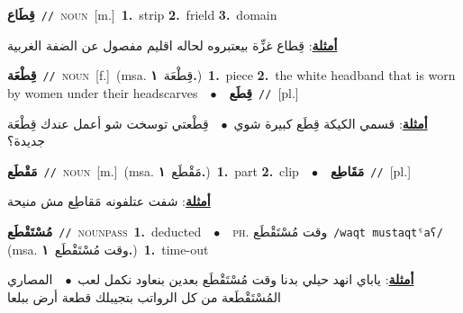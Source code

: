 \documentclass[10pt,a4paper,twoside]{article} %
\begin{document}
\begin{multicols}{2}
{\setlength\topsep{0pt}\textbf{\foreignlanguage{arabic}{قِطَاع}}\ {\color{gray}\texttt{//}\color{black}}\ \textsc{noun}\ [m.]\ \textbf{1.}~strip  \textbf{2.}~frield  \textbf{3.}~domain\  \begin{flushright}\color{gray}\foreignlanguage{arabic}{\textbf{\underline{\foreignlanguage{arabic}{أمثلة}}}: قِطاع غزِّة بيعتبروه لحاله اقليم مفصول عن الضفة الغربية}\end{flushright}\color{black}} \vspace{2mm}

{\setlength\topsep{0pt}\textbf{\foreignlanguage{arabic}{قِطْعَة}}\ {\color{gray}\texttt{//}\color{black}}\ \textsc{noun}\ [f.]\ \color{gray}(msa. \foreignlanguage{arabic}{قِطْعَة}~\foreignlanguage{arabic}{\textbf{١.}})\color{black}\ \textbf{1.}~piece  \textbf{2.}~the white headband that is worn by women under their headscarves\ \ $\bullet$\ \ \setlength\topsep{0pt}\textbf{\foreignlanguage{arabic}{قِطَع}}\ {\color{gray}\texttt{//}\color{black}}\ [pl.]\  \begin{flushright}\color{gray}\foreignlanguage{arabic}{\textbf{\underline{\foreignlanguage{arabic}{أمثلة}}}: قسمي الكيكة قِطَع كبيرة شوي\ $\bullet$\ \  قِطْعتي توسخت شو أعمل عندك قِطْعَة جديدة؟}\end{flushright}\color{black}} \vspace{2mm}

{\setlength\topsep{0pt}\textbf{\foreignlanguage{arabic}{مَقْطَع}}\ {\color{gray}\texttt{//}\color{black}}\ \textsc{noun}\ [m.]\ \color{gray}(msa. \foreignlanguage{arabic}{مَقْطَع}~\foreignlanguage{arabic}{\textbf{١.}})\color{black}\ \textbf{1.}~part  \textbf{2.}~clip\ \ $\bullet$\ \ \setlength\topsep{0pt}\textbf{\foreignlanguage{arabic}{مَقَاطِع}}\ {\color{gray}\texttt{//}\color{black}}\ [pl.]\  \begin{flushright}\color{gray}\foreignlanguage{arabic}{\textbf{\underline{\foreignlanguage{arabic}{أمثلة}}}: شفت عتلفونه مَقاطِع مش منيحة}\end{flushright}\color{black}} \vspace{2mm}

{\setlength\topsep{0pt}\textbf{\foreignlanguage{arabic}{مُسْتَقْطَع}}\ {\color{gray}\texttt{//}\color{black}}\ \textsc{noun\textunderscore pass}\ \textbf{1.}~deducted\ \ $\bullet$\ \ \textsc{ph.} \color{gray} \foreignlanguage{arabic}{وقت مُسْتَقْطَع}\color{black}\ {\color{gray}\texttt{/{\sffamily waqt mustaqtˤaʕ}/}\color{black}}\ \color{gray} (msa. \foreignlanguage{arabic}{وقت مُسْتَقْطَع}~\foreignlanguage{arabic}{\textbf{١.}})\color{black}\ \textbf{1.}~time-out\  \begin{flushright}\color{gray}\foreignlanguage{arabic}{\textbf{\underline{\foreignlanguage{arabic}{أمثلة}}}: ياباي انهد حيلي بدنا وقت مُسْتَقْطَع بعدين بنعاود نكمل لعب\ $\bullet$\ \  المصاري المُسْتَقْطَعة من كل الرواتب بتجيبلك قطعة أرض ببلعا}\end{flushright}\color{black}} \vspace{2mm}


\end{multicols}
\end{document}
